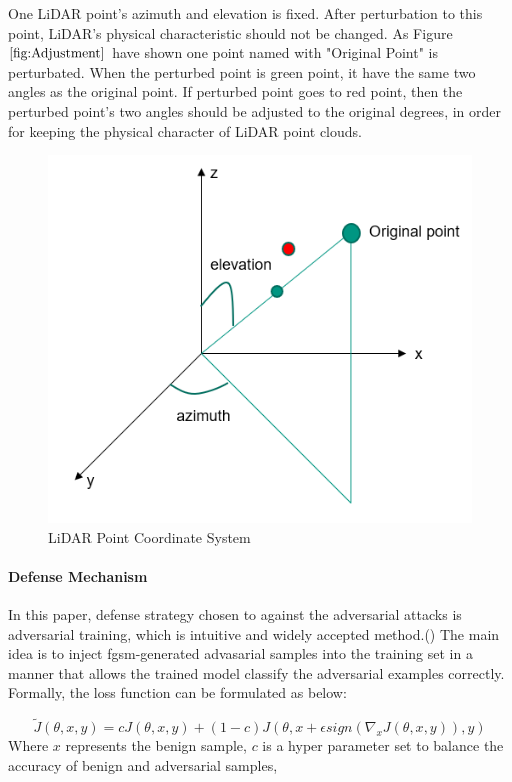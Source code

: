  One LiDAR point's azimuth and elevation is fixed. After perturbation to this point, LiDAR's physical characteristic should not be changed. As Figure \(\ref{fig:Adjustment}\) have shown one point named with "Original Point" is perturbated. When the perturbed point is green point, it have the same two angles as the original point. If perturbed point goes to red point, then the perturbed point's two angles should be adjusted to the original degrees, in order for keeping the physical character of LiDAR point clouds.
 \begin{figure}[!htbp]
\centering
\includegraphics[scale=0.5]{Graphics/Adjustment.png}
\caption{LiDAR Point Coordinate System}
\label{fig:Adjustment}
\end{figure}

\paragraph{Defense Mechanism}
In this paper, defense strategy chosen to against the adversarial attacks is adversarial training, which is intuitive and widely accepted method.() The main idea is to inject \acrshort{fgsm}-generated advasarial samples into the training set in a manner that allows the trained model classify the adversarial examples correctly\cite{goodfellow_explaining_2015}. Formally, the loss function can be formulated as below:

\begin{equation}
          \widetilde{J}(\theta,x,y) = c J(\theta,x,y)+(1-c)J(\theta,x+\epsilon sign(\nabla_{x}J(\theta,x,y)),y)
\end{equation}
Where \(x\) represents the benign sample, \(c\) is a hyper parameter set to balance the accuracy of benign and adversarial samples, 


